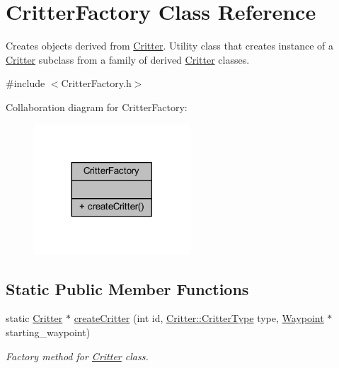\hypertarget{class_critter_factory}{\section{Critter\+Factory Class Reference}
\label{class_critter_factory}
}


Creates objects derived from \hyperlink{class_critter}{Critter}. Utility class that creates instance of a \hyperlink{class_critter}{Critter} subclass from a family of derived \hyperlink{class_critter}{Critter} classes.  




{\ttfamily \#include $<$Critter\+Factory.\+h$>$}



Collaboration diagram for Critter\+Factory\+:\nopagebreak
\begin{figure}[H]
\begin{center}
\leavevmode
\includegraphics[width=165pt]{class_critter_factory__coll__graph}
\end{center}
\end{figure}
\subsection*{Static Public Member Functions}
\begin{DoxyCompactItemize}
\item 
static \hyperlink{class_critter}{Critter} $\ast$ \hyperlink{class_critter_factory_a3195f421d348fe4ee5c7e49e605745c1}{create\+Critter} (int id, \hyperlink{class_critter_acda8a5c3234b66101e0546d75d6f90f1}{Critter\+::\+Critter\+Type} type, \hyperlink{class_waypoint}{Waypoint} $\ast$starting\+\_\+waypoint)
\begin{DoxyCompactList}\small\item\em Factory method for \hyperlink{class_critter}{Critter} class. \end{DoxyCompactList}\end{DoxyCompactItemize}


